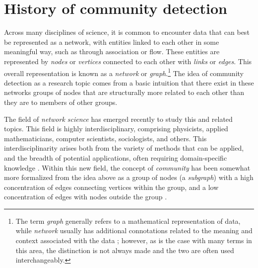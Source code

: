 \hypertarget{history}{\section{History of community
detection}\label{history}}

Across many disciplines of science, it is common to encounter data that
can best be represented as a network, with entities linked to each other
in some meaningful way, such as through association or flow. These
entities are represented by \emph{nodes} or \emph{vertices} connected to
each other with \emph{links} or \emph{edges}. This overall
representation is known as a \emph{network} or \emph{graph}.\footnote{The
  term \emph{graph} generally refers to a mathematical representation of
  data, while \emph{network} usually has additional connotations related
  to the meaning and context associated with the data
  \autocite{porter_communities_2009}; however, as is the case with many
  terms in this area, the distinction is not always made and the two are
  often used interchangeably.} The idea of community detection as a
research topic comes from a basic intuition that there exist in these
networks groups of nodes that are structurally more related to each
other than they are to members of other groups.

The field of \emph{network science} has emerged recently to study this
and related topics. This field is highly interdisciplinary, comprising
physicists, applied mathematicians, computer scientists, sociologists,
and others. This interdisciplinarity arises both from the variety of
methods that can be applied, and the breadth of potential applications,
often requiring domain-specific knowledge
\autocite{porter_communities_2009}. Within this new field, the concept
of \emph{community} has been somewhat more formalized from the idea
above as a group of nodes (a \emph{subgraph}) with a high concentration
of edges connecting vertices within the group, and a low concentration
of edges with nodes outside the group
\autocite{fortunato_community_2010}.

